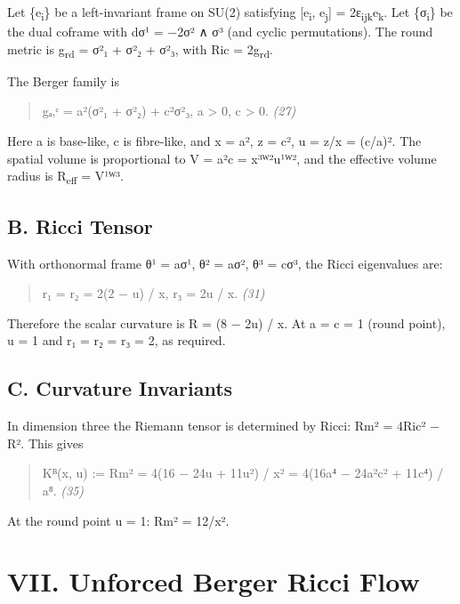 \documentclass[
]{article}
\begin{document}
Let \{e\textsubscript{i}\} be a left-invariant frame on SU(2) satisfying {[}e\textsubscript{i}, e\textsubscript{j}{]} = 2ε\textsubscript{ijk}e\textsubscript{k}. Let \{σ\textsubscript{i}\} be the dual coframe with dσ¹ = −2σ² ∧ σ³ (and cyclic permutations). The round metric is g\textsubscript{rd} = σ²₁ + σ²₂ + σ²₃, with Ric = 2g\textsubscript{rd}.

The Berger family is

\begin{quote}
gₐ,ᶜ = a²(σ²₁ + σ²₂) + c²σ²₃, a \textgreater{} 0, c \textgreater{} 0. \emph{(27)}
\end{quote}

Here a is base-like, c is fibre-like, and x = a², z = c², u = z/x = (c/a)². The spatial volume is proportional to V = a²c = x³ᵂ²u¹ᵂ², and the effective volume radius is R\textsubscript{eff} = V¹ᵂ³.

\subsection{B. Ricci Tensor}\label{b.-ricci-tensor}

With orthonormal frame θ¹ = aσ¹, θ² = aσ², θ³ = cσ³, the Ricci eigenvalues are:

\begin{quote}
r₁ = r₂ = 2(2 − u) / x, r₃ = 2u / x. \emph{(31)}
\end{quote}

Therefore the scalar curvature is R = (8 − 2u) / x. At a = c = 1 (round point), u = 1 and r₁ = r₂ = r₃ = 2, as required.

\subsection{C. Curvature Invariants}\label{c.-curvature-invariants}

In dimension three the Riemann tensor is determined by Ricci: \textbar Rm\textbar² = 4\textbar Ric\textbar² − R². This gives

\begin{quote}
Kᴮ(x, u) := \textbar Rm\textbar² = 4(16 − 24u + 11u²) / x² = 4(16a⁴ − 24a²c² + 11c⁴) / a⁸. \emph{(35)}
\end{quote}

At the round point u = 1: \textbar Rm\textbar² = 12/x².

\section{VII. Unforced Berger Ricci Flow}\label{vii.-unforced-berger-ricci-flow}
\end{document}
